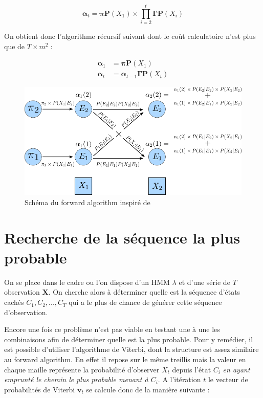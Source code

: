 \documentclass[12pt, french]{report}
\begin{document}
\begin{equation}
\bm{\alpha}_t = \bm{\pi} \bm{P}(X_1) \times \prod\limits_{i=2}^t \bm{\Gamma}\bm{P}(X_i)
\end{equation}

On obtient donc l'algorithme récursif suivant dont le coût calculatoire n'est plus que de $T \times m^2$ :

\begin{align} 
\label{eq::HMM:ForwardAlgo}
\bm{\alpha}_1 &= \bm{\pi} \bm{P}(X_1) \\ 
\bm{\alpha}_t &= \bm{\alpha}_{t-1} \bm{\Gamma} \bm{P}(X_t)
\end{align}

\begin{figure}[ht]
	\begin{center}
		\includegraphics[width= 0.8 \textwidth]{Images/Models/HMM/Forward.png}
		\caption{Schéma du forward algorithm inspiré de \cite{jurafsky_speech_2017} }
		\label{fig::HMM:ForwardAlgo}
	\end{center}
\end{figure}
		
\section{Recherche de la séquence la plus probable}
On se place dans le cadre ou l'on dispose d'un HMM $\lambda$ et d'une série de $T$ observation $\bm{X}$. On cherche alors à déterminer quelle est la séquence d'états cachés $C_1,C_2,...,C_T$ qui a le plus de chance de générer cette séquence d'observation.

Encore une fois ce problème n'est pas viable en testant une à une les combinaisons afin de déterminer quelle est la plus probable. Pour y remédier, il est possible d'utiliser l'algorithme de Viterbi, dont la structure est assez similaire au forward algorithm. En effet il repose sur le même treillis mais la valeur en chaque maille représente la probabilité d'observer $X_t$ depuis l'état $C_i$ \textit{en ayant emprunté le chemin le plus probable menant à $C_i$}. A l'itération $t$ le vecteur de probabilités de Viterbi $\bm{v}_t$ se calcule donc de la manière suivante :
\end{document}
